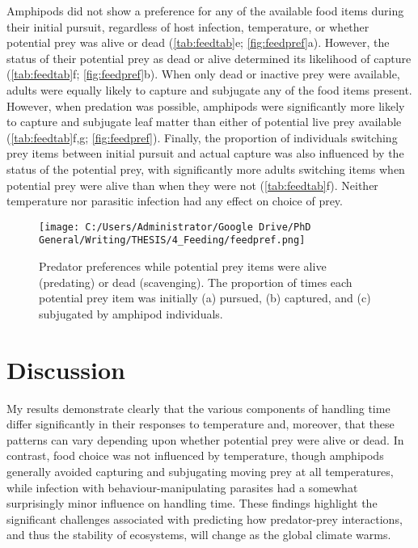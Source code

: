 Amphipods did not show a preference for any of the available food items during their initial pursuit, regardless of host infection, temperature, or whether potential prey was alive or dead (\ref{tab:feedtab}e; \ref{fig:feedpref}a). However, the status of their potential prey as dead or alive determined its likelihood of capture (\ref{tab:feedtab}f; \ref{fig:feedpref}b). When only dead or inactive prey were available, adults were equally likely to capture and subjugate any of the food items present. However, when predation was possible, amphipods were significantly more likely to capture and subjugate leaf matter than either of potential live prey available (\ref{tab:feedtab}f,g; \ref{fig:feedpref}). Finally, the proportion of individuals switching prey items between initial pursuit and actual capture was also influenced by the status of the potential prey, with significantly more adults switching items when potential prey were alive than when they were not (\ref{tab:feedtab}f). Neither temperature nor parasitic infection had any effect on choice of prey. 

\begin{figure}%
    \centering
    \texttt{[image: C:/Users/Administrator/Google Drive/PhD General/Writing/THESIS/4\_Feeding/feedpref.png]}
  \caption [Predator preferences while potential prey items were alive (predating) or dead (scavenging).]{Predator preferences while potential prey items were alive (predating) or dead (scavenging). The proportion of times each potential prey item was initially (a) pursued, (b) captured, and (c) subjugated by amphipod individuals.} 
    \label{fig:propeat}
\end{figure}

\section{Discussion}

My results demonstrate clearly that the various components of handling time differ significantly in their responses to temperature and, moreover, that these patterns can vary depending upon whether potential prey were alive or dead. In contrast, food choice was not influenced by temperature, though amphipods generally avoided capturing and subjugating moving prey at all temperatures, while infection with behaviour-manipulating parasites had a somewhat surprisingly minor influence on handling time. These findings highlight the significant challenges associated with predicting how predator-prey interactions, and thus the stability of ecosystems, will change as the global climate warms.

